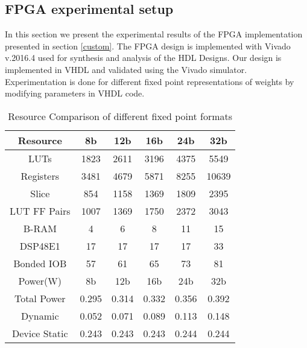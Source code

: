 \subsection{FPGA experimental setup}\label{fpga_results}
In this section we present the experimental results of the FPGA implementation presented in section \ref{custom}. The FPGA design is implemented with Vivado v.2016.4 used for synthesis and analysis of the HDL Designs. Our design is implemented in VHDL and validated using the Vivado simulator. Experimentation is done for different fixed point representations of weights by modifying parameters in VHDL code. 

\begin{table}[h!]
	\centering
	\caption{Resource Comparison of different fixed point formats}
	\label{table:1}
	\begin{tabular}{ c |c | c| c |c | c } 
		\toprule
		Resource & 8b & 12b & 16b & 24b & 32b \\ 
		\midrule
		LUTs & 1823 & 2611 &3196 & 4375 & 5549 \\
		\hline
		Registers & 3481 & 4679 & 5871 & 8255 & 10639 \\ 
		\hline
		Slice & 854 & 1158 & 1369 &1809 & 2395 \\ 
		\hline
		LUT FF Pairs & 1007 & 1369 & 1750 & 2372 & 3043 \\
		\hline
		B-RAM & 4 & 6 & 8 & 11 & 15 \\
		\hline
		DSP48E1 & 17 & 17 & 17 & 17 & 33 \\
		\hline
		Bonded IOB & 57 & 61 & 65 & 73 & 81 \\
		\midrule
	
		\midrule
		Power(W) & 8b & 12b & 16b & 24b & 32b \\ 
		\midrule
		Total Power & 0.295 &0.314 &0.332 &0.356 &0.392 \\
		\hline
		Dynamic &0.052 &0.071 &0.089 &0.113 &0.148 \\ 
		\hline
		Device Static &0.243 &0.243 &0.243 &0.244 &0.244 \\ 
		\bottomrule
	\end{tabular}
\end{table}

